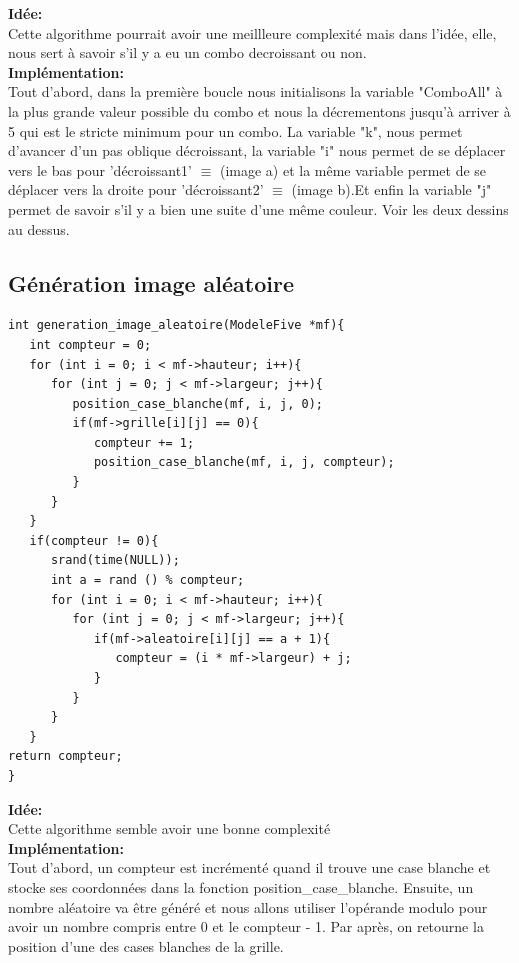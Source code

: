 \documentclass[a4paper, 11pt, oneside]{article}
\begin{document}
\textbf{Idée:}\\
Cette algorithme pourrait avoir une meillleure complexité mais dans l'idée, elle, nous sert à savoir s'il y a eu un combo decroissant ou non.
\\
\textbf{Implémentation:}\\
Tout d'abord, dans la première boucle nous initialisons la variable "ComboAll" à la plus grande valeur possible du combo et nous la décrementons jusqu'à arriver à 5 qui est le stricte minimum pour un combo.
La variable "k", nous permet d'avancer d'un pas oblique décroissant, la variable "i" nous permet de se déplacer vers le bas pour 'décroissant1' $\equiv$ (image a) et la même variable permet de se déplacer vers la droite pour 'décroissant2' $\equiv$ (image b).Et enfin la variable "j" permet de savoir s'il y a bien une suite d'une même couleur.
Voir les deux dessins au dessus.

\subsection{Génération image aléatoire}
\begin{lstlisting}
int generation_image_aleatoire(ModeleFive *mf){
   int compteur = 0;
   for (int i = 0; i < mf->hauteur; i++){
      for (int j = 0; j < mf->largeur; j++){
         position_case_blanche(mf, i, j, 0);
         if(mf->grille[i][j] == 0){
            compteur += 1;
            position_case_blanche(mf, i, j, compteur);  
         }
      }
   }
   if(compteur != 0){
      srand(time(NULL));
      int a = rand () % compteur;
      for (int i = 0; i < mf->hauteur; i++){
         for (int j = 0; j < mf->largeur; j++){
            if(mf->aleatoire[i][j] == a + 1){ 
               compteur = (i * mf->largeur) + j;
            }
         }
      }
   }
return compteur;
}
\end{lstlisting}
\textbf{Idée:}\\
    Cette algorithme semble avoir une bonne complexité 
\\
\textbf{Implémentation:}\\
Tout d'abord, un compteur est incrémenté quand il trouve une case blanche et stocke ses coordonnées dans la fonction position\_case\_blanche. Ensuite, un nombre aléatoire va être généré et nous allons utiliser l'opérande modulo pour avoir un nombre compris entre 0 et le compteur - 1.
Par après, on retourne la position d'une des cases blanches de la grille.
\end{document}
